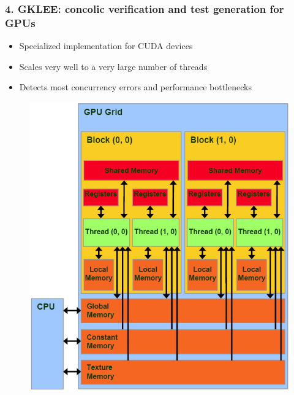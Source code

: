 \documentclass{beamer}
\begin{document}
	
	\begin{frame}
		\frametitle{4. GKLEE: concolic verification and test generation for GPUs \cite{base7}}
		
		\begin{itemize}
			\item Specialized implementation for CUDA devices
			\item Scales very well to a very large number of threads
			\item Detects most concurrency errors and performance bottlenecks
		\end{itemize}
	\end{frame}
	
	\begin{frame}
		\begin{figure}[htbp]
			\centering
			\includegraphics[scale=0.4]{CUDA-memory-model}
		\end{figure}
	\end{frame}
	
\end{document}

